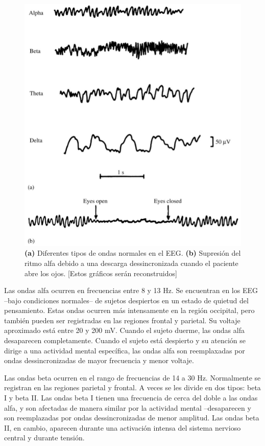 \begin{figure}
\centering
\includegraphics[width=0.7\linewidth]{figura_4.png} 
\caption{\textbf{(a)} Diferentes tipos de ondas normales en el EEG.
\textbf{(b)} Supresi\'on del ritmo alfa debido a una descarga dessincronizada cuando
el paciente abre los ojos.
[Estos gr\'aficos ser\'an reconstruidos]
}
\label{ritmos}
\end{figure}


Las ondas alfa ocurren en frecuencias entre 8 y 13 Hz. 
Se encuentran en
los EEG --bajo condiciones normales--
de sujetos despiertos en un estado de quietud del pensamiento.
Estas ondas ocurren m\'as intensamente en la regi\'on occipital, pero tambi\'en pueden ser
registradas en las regiones frontal y parietal. Su voltaje aproximado est\'a entre 20 y 200 mV.
Cuando el sujeto duerme, las ondas alfa desaparecen completamente. 
Cuando el sujeto est\'a
despierto y su atenci\'on se dirige a una actividad mental espec\'ifica, las ondas alfa
son reemplaxadas por ondas dessincronizadas de mayor frecuencia y menor voltaje.

Las ondas beta ocurren en el rango de frecuencias de 14 a 30 Hz.
Normalmente se registran en las regiones parietal y frontal. A veces se les divide
 en dos tipos: beta I y beta II. Las ondas beta I tienen una frecuencia de cerca del doble a
 las ondas alfa, y son afectadas de manera similar por la actividad mental --desaparecen
y son reemplazadas por ondas dessincronizadas de menor amplitud.
Las ondas beta II, en cambio, aparecen durante una activaci\'on intensa del sistema nervioso
central y durante tensi\'on.

